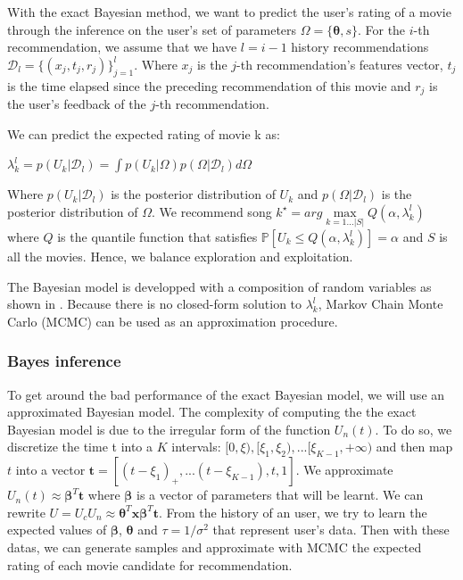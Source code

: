 \documentclass[letterpaper]{article}
\begin{document}
With the exact Bayesian method, we want to predict the user's rating of a movie through the inference on the user's set of parameters $\Omega = \lbrace \boldsymbol{\theta} , s \rbrace $. For the $i$-th recommendation, we assume that we have $l = i-1$ history recommendations $ \mathcal{D}_l = \lbrace (x_j, t_j, r_j) \rbrace^l_{j=1}$. Where $x_j$ is the $j$-th recommendation's features vector, $t_j$ is the time elapsed since the preceding recommendation of this movie and $r_j$ is the user's feedback of the $j$-th recommendation.

We can predict the expected rating of movie k as:
\begin{center}
$\lambda^l_k = p(U_k | \mathcal{D}_l) = \int p(U_k|\Omega)p(\Omega| \mathcal{D}_l)d\Omega$
\end{center}
Where $p(U_k|\mathcal{D}_l)$ is the posterior distribution of $U_k$ and $ p(\Omega| \mathcal{D}_l) $ is the posterior distribution of $ \Omega $. We recommend song $k^{\star} = arg \max\limits_{k=1...|S|} Q(\alpha, \lambda^l_k)$ where $Q$ is the quantile function that satisfies $ \mathbb{P} [ U_k \le Q(\alpha, \lambda^l_k) ]=\alpha$ and $S$ is all the movies. 
Hence, we balance exploration and exploitation.

The Bayesian model is developped with a composition of random variables as shown in \cite{main}. Because there is no closed-form solution to $ \lambda^l_k$, Markov Chain Monte Carlo (MCMC) can be used as an approximation procedure.

\subsubsection{Bayes inference}

To get around the bad performance of the exact Bayesian model, we will use an approximated Bayesian model. The complexity of computing the the exact Bayesian model is due to the irregular form of the function $U_n(t)$. To do so, we discretize the time t into a $K$ intervals: $ [0, \xi), [\xi_1,\xi_2),...[\xi_{K-1}, +\infty)$ and then map $t$ into a vector $\boldsymbol{t} = [(t-\xi_1)_{+},...(t-\xi_{K-1}),t,1]$. We approximate $U_n(t) \approx \boldsymbol{\beta}^{T}\boldsymbol{t} $ where $ \boldsymbol{\beta}$ is a vector of parameters that will be learnt. We can rewrite $ U = U_c U_n \approx \boldsymbol{\theta}^{T} \boldsymbol{x} \boldsymbol{\beta}^{T} \boldsymbol{t} $. From the history of an user, we try to learn the expected values of $\boldsymbol{\beta}$, $\boldsymbol{\theta}$ and $\tau = 1/\sigma^2$ that represent user's data. Then with these datas, we can generate samples and approximate with MCMC the expected rating of each movie candidate for recommendation.
\end{document}
